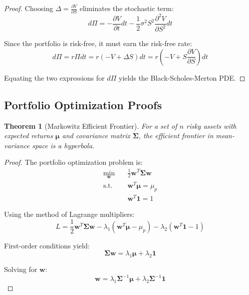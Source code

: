 \documentclass[12pt,a4paper]{article}
\newtheorem{theorem}{Theorem}[section]
\theoremstyle{definition}
\theoremstyle{remark}
\begin{document}
\begin{appendices}
\begin{proof}
Choosing $\Delta = \frac{\partial V}{\partial S}$ eliminates the stochastic term:
\begin{equation}
d\Pi = -\frac{\partial V}{\partial t}dt - \frac{1}{2}\sigma^2 S^2 \frac{\partial^2 V}{\partial S^2}dt
\end{equation}

Since the portfolio is risk-free, it must earn the risk-free rate:
\begin{equation}
d\Pi = r\Pi dt = r(-V + \Delta S)dt = r\left(-V + S\frac{\partial V}{\partial S}\right)dt
\end{equation}

Equating the two expressions for $d\Pi$ yields the Black-Scholes-Merton PDE.
\end{proof}

\subsection{Portfolio Optimization Proofs}

\begin{theorem}[Markowitz Efficient Frontier]
\label{thm:efficient_frontier}
For a set of $n$ risky assets with expected returns $\boldsymbol{\mu}$ and covariance matrix $\boldsymbol{\Sigma}$, the efficient frontier in mean-variance space is a hyperbola.
\end{theorem}

\begin{proof}
The portfolio optimization problem is:
\begin{align}
\min_{\mathbf{w}} \quad & \frac{1}{2}\mathbf{w}^T\boldsymbol{\Sigma}\mathbf{w}\\
\text{s.t.} \quad & \mathbf{w}^T\boldsymbol{\mu} = \mu_p\\
& \mathbf{w}^T\mathbf{1} = 1
\end{align}

Using the method of Lagrange multipliers:
\begin{equation}
L = \frac{1}{2}\mathbf{w}^T\boldsymbol{\Sigma}\mathbf{w} - \lambda_1(\mathbf{w}^T\boldsymbol{\mu} - \mu_p) - \lambda_2(\mathbf{w}^T\mathbf{1} - 1)
\end{equation}

First-order conditions yield:
\begin{equation}
\boldsymbol{\Sigma}\mathbf{w} = \lambda_1\boldsymbol{\mu} + \lambda_2\mathbf{1}
\end{equation}

Solving for $\mathbf{w}$:
\begin{equation}
\mathbf{w} = \lambda_1\boldsymbol{\Sigma}^{-1}\boldsymbol{\mu} + \lambda_2\boldsymbol{\Sigma}^{-1}\mathbf{1}
\end{equation}


\end{proof}
\end{appendices}
\end{document}
